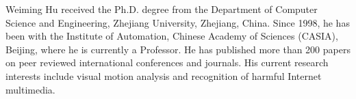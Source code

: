 \documentclass[journal]{IEEEtran}
\begin{document}
\begin{IEEEbiography}
{Weiming Hu}
received the Ph.D. degree from the Department of Computer Science and Engineering, Zhejiang University, Zhejiang, China. Since 1998, he has been with the Institute of Automation, Chinese Academy of Sciences (CASIA), Beijing, where he is currently a Professor. He has published more than 200 papers on peer reviewed international conferences and journals. His current research interests include visual motion analysis and recognition of harmful Internet multimedia.
\end{IEEEbiography}
\end{document}
